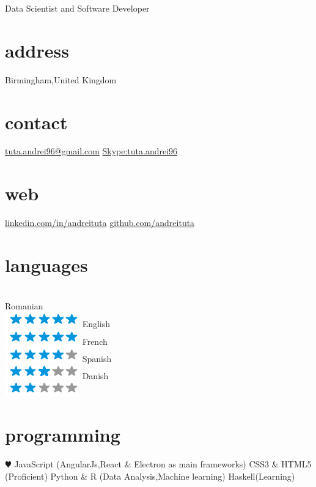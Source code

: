 \documentclass[]{friggeri-cv}
\begin{document}
       {Data Scientist and Software Developer}


\begin{aside}
  \section{address}
    Birmingham,United Kingdom
    ~
    \section{contact}
    \href{mailto:tuta.andrei96@gmail.com}{tuta.andrei96@gmail.com}
    \href{Skype : tuta.andrei96}{Skype:tuta.andrei96}
    ~
    \section{web}
    \href{http://linkedin.com/in/andreituta}{linkedin.com/in/andreituta}
    \href{http://github.com/andreituta}{github.com/andreituta}
    ~ 
    
  \section{languages} 
  \\Romanian \\ \includegraphics[scale=0.30]{img/5stars.png}
  English \\ \includegraphics[scale=0.30]{img/5stars.png}
  French \\ \includegraphics[scale=0.30]{img/4stars.png}
  Spanish \\ \includegraphics[scale=0.30]{img/3stars.png}
  Danish \\ \includegraphics[scale=0.30]{img/2stars.png}
    ~
    
  \section{programming}
    {\color{red} $\varheartsuit$} JavaScript
    (AngularJs,React \& Electron as main frameworks)
    CSS3 \& HTML5 (Proficient)
    Python \& R (Data Analysis,Machine learning)
    Haskell(Learning)
    
    ~

\end{aside}
\end{document}
